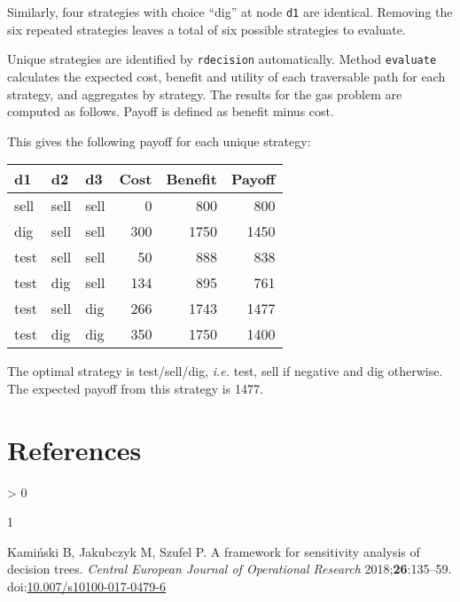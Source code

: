 \documentclass[
]{article}
\newenvironment{Shaded}{\begin{snugshade}}{\end{snugshade}}
\newcommand{\CommentTok}[1]{\textcolor[rgb]{0.56,0.35,0.01}{\textit{#1}}}
\newcommand{\FunctionTok}[1]{\textcolor[rgb]{0.00,0.00,0.00}{#1}}
\newcommand{\NormalTok}[1]{#1}
\newcommand{\OtherTok}[1]{\textcolor[rgb]{0.56,0.35,0.01}{#1}}
\newcommand{\SpecialCharTok}[1]{\textcolor[rgb]{0.00,0.00,0.00}{#1}}
\newlength{\cslhangindent}
\newlength{\csllabelwidth}
\newenvironment{CSLReferences}[2] %
 {%
  \setlength{\parindent}{0pt}
  \ifodd #1 \everypar{\setlength{\hangindent}{\cslhangindent}}\ignorespaces\fi
  \ifnum #2 > 0
  \setlength{\parskip}{#2\baselineskip}
  \fi
 }%
 {}
\newcommand{\CSLLeftMargin}[1]{\parbox[t]{\csllabelwidth}{#1}}
\newcommand{\CSLRightInline}[1]{\parbox[t]{\linewidth - \csllabelwidth}{#1}\break}
\begin{document}
Similarly, four strategies with choice ``dig'' at node \texttt{d1} are
identical. Removing the six repeated strategies leaves a total of six
possible strategies to evaluate.

Unique strategies are identified by \texttt{rdecision} automatically.
Method \texttt{evaluate} calculates the expected cost, benefit and
utility of each traversable path for each strategy, and aggregates by
strategy. The results for the gas problem are computed as follows.
Payoff is defined as benefit minus cost.

\begin{Shaded}
\end{Shaded}

This gives the following payoff for each unique strategy:

\begin{longtable}[]{@{}lllrrr@{}}
\toprule
d1 & d2 & d3 & Cost & Benefit & Payoff\tabularnewline
\midrule
\endhead
sell & sell & sell & 0 & 800 & 800\tabularnewline
dig & sell & sell & 300 & 1750 & 1450\tabularnewline
test & sell & sell & 50 & 888 & 838\tabularnewline
test & dig & sell & 134 & 895 & 761\tabularnewline
test & sell & dig & 266 & 1743 & 1477\tabularnewline
test & dig & dig & 350 & 1750 & 1400\tabularnewline
\bottomrule
\end{longtable}

The optimal strategy is test/sell/dig, \emph{i.e.} test, sell if
negative and dig otherwise. The expected payoff from this strategy is
1477.

\hypertarget{references}{%
\section*{References}\label{references}}

\hypertarget{refs}{}
\begin{CSLReferences}{0}{0}
\leavevmode\hypertarget{ref-kaminski:2018a}{}%
\CSLLeftMargin{1 }
\CSLRightInline{Kamiński B, Jakubczyk M, Szufel P. A framework for
sensitivity analysis of decision trees. \emph{Central European Journal
of Operational Research} 2018;\textbf{26}:135--59.
doi:\href{https://doi.org/10.007/s10100-017-0479-6}{10.007/s10100-017-0479-6}}

\end{CSLReferences}
\end{document}
